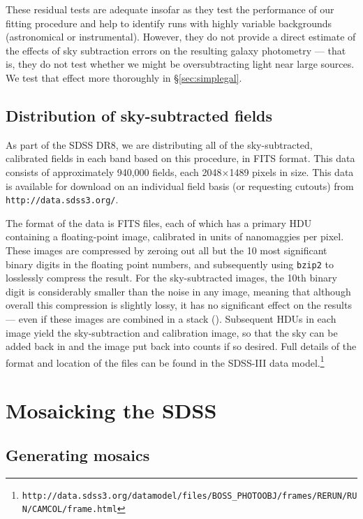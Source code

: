 \documentclass[10pt,preprint]{aastex}
\begin{document}
These residual tests are adequate insofar as they test the performance
of our fitting procedure and help to identify runs with highly
variable backgrounds (astronomical or instrumental).  However, they do
not provide a direct estimate of the effects of sky subtraction errors
on the resulting galaxy photometry --- that is, they do not test
whether we might be oversubtracting light near large sources.  We test
that effect more thoroughly in \S\ref{sec:simplegal}.

\subsection{Distribution of sky-subtracted fields}
\label{sec:fields}

As part of the SDSS DR8, we are distributing all of the
sky-subtracted, calibrated fields in each band based on this
procedure, in FITS format. This data consists of approximately 
940,000 fields, each 2048$\times$1489 pixels in size. This data is
available for download on an individual field basis (or requesting
cutouts) from {\tt http://data.sdss3.org/}. 

The format of the data is FITS files, each of which has a primary HDU
containing a floating-point image, calibrated in units of nanomaggies
per pixel.  These images are compressed by zeroing out all but the 10
most significant binary digits in the floating point numbers, and
subsequently using {\tt bzip2} to losslessly compress the result. For
the sky-subtracted images, the 10th binary digit is considerably
smaller than the noise in any image, meaning that although overall
this compression is slightly lossy, it has no significant effect on
the results --- even if these images are combined in a stack
(\citealt{pricewhelan10a}).  Subsequent HDUs in each image yield the
sky-subtraction and calibration image, so that the sky can be added
back in and the image put back into counts if so desired. Full details
of the format and location of the files can be found in the SDSS-III
data
model.\footnote{\tt http://data.sdss3.org/datamodel/files/BOSS\_PHOTOOBJ/frames/RERUN/RUN/CAMCOL/frame.html} 


\section{Mosaicking the SDSS}
\label{sec:mosaic}

\subsection{Generating mosaics}
\end{document}
